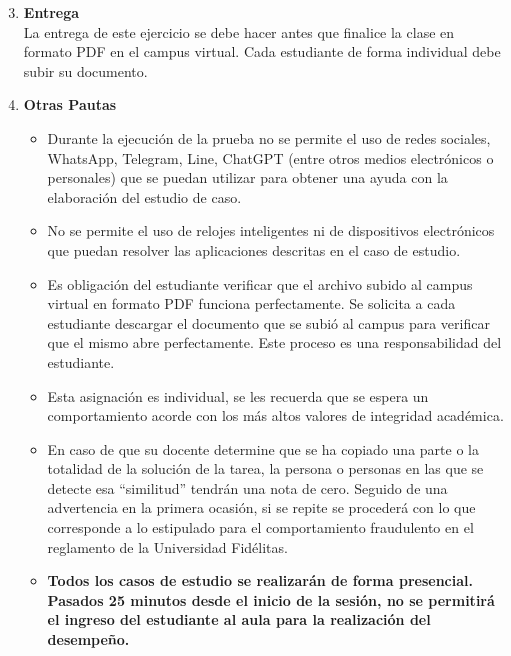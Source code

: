   \newpage
\begin{enumerate}
  \setcounter{enumi}{2}
\item \textbf{Entrega}\\
  La entrega de este ejercicio se debe hacer antes que finalice la clase
  en formato PDF en el campus virtual.
  Cada estudiante de forma individual debe subir su documento.
\item \textbf{Otras Pautas}
  \begin{itemize}
    \item
      Durante la ejecución de la prueba no se permite el uso de redes sociales,
      WhatsApp, Telegram, Line, ChatGPT
      (entre otros medios electrónicos o personales)
      que se puedan utilizar para obtener una ayuda con la elaboración del
      estudio de caso.
    \item
      No se permite el uso de relojes inteligentes ni de dispositivos
      electrónicos que puedan resolver las aplicaciones descritas en el caso
      de estudio.
    \item
      Es obligación del estudiante verificar que el archivo subido al campus
      virtual en formato PDF funciona perfectamente.
      Se solicita a cada estudiante descargar el documento que se subió al
      campus para verificar que el mismo abre perfectamente.
      Este proceso es una responsabilidad del estudiante.
   \item
     Esta asignación es individual,
     se les recuerda que se espera un comportamiento acorde con
     los más altos valores de integridad académica.
    \item
      En caso de que su docente determine que se ha copiado una parte o
      la totalidad de la solución de la tarea,
      la persona o personas en las que se detecte esa “similitud”
      tendrán una nota de cero.
      Seguido de una advertencia en la primera ocasión,
      si se repite se procederá con lo que corresponde a lo estipulado para 
      el comportamiento fraudulento en el reglamento de la
      Universidad Fidélitas.
    \item \textbf{
      Todos los casos de estudio se realizarán de forma presencial.
      Pasados 25 minutos desde el inicio de la sesión,
      no se permitirá el ingreso del estudiante al aula para la realización del
    desempeño.}
  \end{itemize}
\end{enumerate}
